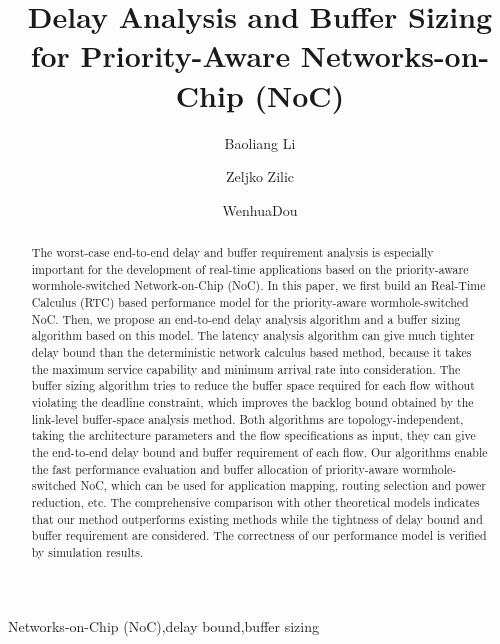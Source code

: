 \documentclass[preprint]{elsarticle}
\begin{document}
\begin{frontmatter}

\title{Delay Analysis and Buffer Sizing for Priority-Aware Networks-on-Chip (NoC)}

\author[nudt]{Baoliang Li}
\author[mcgill]{Zeljko Zilic}
\author[nudt]{WenhuaDou}
\address[nudt]{College of Computer Science, National University of Defense Technology, Changsha 410073, P.R. China}
\address[mcgill]{Department of Electrical $\&$ Computer Engineering, McGill University, Montreal H3A-2A7, Quebec, Canada}

\begin{abstract}
The worst-case end-to-end delay and buffer requirement analysis is especially important for the development of real-time applications based on the priority-aware wormhole-switched Network-on-Chip (NoC). In this paper, we first build an Real-Time Calculus (RTC) based performance model for the priority-aware wormhole-switched NoC. Then, we propose an end-to-end delay analysis algorithm and a buffer sizing algorithm based on this model. The latency analysis algorithm can give much tighter delay bound than the deterministic network calculus based method, because it takes the maximum service capability and minimum arrival rate into consideration. The buffer sizing algorithm tries to reduce the buffer space required for each flow without violating the deadline constraint, which improves the backlog bound obtained by the link-level buffer-space analysis method. Both algorithms are topology-independent, taking the architecture parameters and the flow specifications as input, they can give the end-to-end delay bound and buffer requirement of each flow. Our algorithms enable the fast performance evaluation and buffer allocation of priority-aware wormhole-switched NoC, which can be used for application mapping, routing selection and power reduction, etc. The comprehensive comparison with other theoretical models indicates that our method outperforms existing methods while the tightness of delay bound and buffer requirement are considered. The correctness of our performance model is verified by simulation results.
\end{abstract}

\begin{keyword}
Networks-on-Chip (NoC)\sep delay bound\sep buffer sizing
\end{keyword}

\end{frontmatter}
\end{document}
